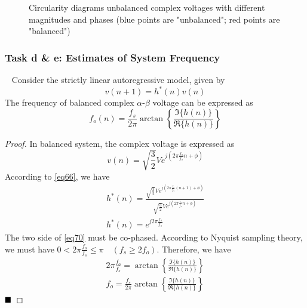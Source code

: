 \documentclass[10pt]{article}
\newtheorem*{proof}{Proof}[section]
\begin{document}
\begin{figure}[htbp]
{    }
    \caption{Circularity diagrams unbalanced complex voltages with different magnitudes and phases (blue points are "unbalanced"; red points are "balanced")}
    \label{fig20}
\end{figure}

\subsubsection{Task d \& e: Estimates of System Frequency}
\ \indent
Consider the strictly linear autoregressive model, given by
\begin{equation}
	v(n+1) = h^*(n)v(n) \label{eq66}
\end{equation}
The frequency of balanced complex $\alpha$-$\beta$ voltage can be expressed as 
\begin{equation}
	f_o(n) = \frac{f_s}{2\pi} \arctan \left\{ \frac{\mathfrak{I}\{ h(n) \}}{\mathfrak{R}\{ h(n) \}} \right\} \label{eq67}
\end{equation}

\begin{proof}
	In balanced system, the complex voltage is expressed as
	\begin{equation}
		v(n) = \sqrt{ \frac{3}{2} } V e^{ j \left( 2\pi \frac{f_o}{f_s} n + \phi \right) }
	\end{equation}
	According to \eqref{eq66}, we have
	\begin{gather}
		h^*(n)  = \frac{\sqrt{ \frac{3}{2} } V e^{ j \left( 2\pi \frac{f_o}{f_s} (n+1) + \phi \right) }}{\sqrt{ \frac{3}{2} } V e^{ j \left( 2\pi \frac{f_o}{f_s} n + \phi \right) }} \\
		h^*(n)  = e^{j 2\pi \frac{f_o}{f_s}} \label{eq70}
	\end{gather}
	The two side of \eqref{eq70} must be co-phased. According to Nyquist sampling 
	theory, we must have $0 < 2\pi \frac{f_o}{f_s} \leq \pi \quad ( f_s \geq 2 f_o )$.
	Therefore, we have
	\begin{gather}
		2 \pi \frac{f_o}{f_s} = \arctan \left\{  \frac{\mathfrak{I}\{ h(n) \}}{\mathfrak{R}\{ h(n) \}} \right\} \\
		f_o = \frac{f_s}{2 \pi} \arctan \left\{  \frac{\mathfrak{I}\{ h(n) \}}{\mathfrak{R}\{ h(n) \}} \right\}
	\end{gather}
	$\hfill\blacksquare$ 
\end{proof}
\end{document}
